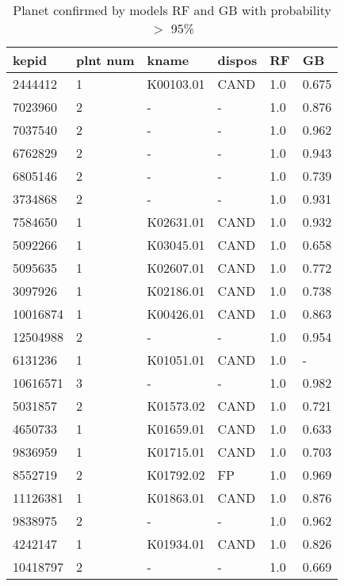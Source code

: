 \begin{table}[!htbp]
 \centering
 \caption{Planet confirmed by models RF and GB with probability $>$ 95\%}
 \label{dataRFGBcreftab} 
  \begin{tabular}
{| 
 p{}| 
 p{}| 
 p{}| 
 p{}| 
 p{}| 
 p{}| 
}\hline 
\textbf{kepid} &\textbf{plnt num} &\textbf{kname} &\textbf{dispos} &\textbf{RF} &\textbf{GB} \\ \hline 
2444412 &1 &K00103.01 &CAND &1.0 &0.675 \\ \hline 
7023960 &2 &- &- &1.0 &0.876 \\ \hline 
7037540 &2 &- &- &1.0 &0.962 \\ \hline 
6762829 &2 &- &- &1.0 &0.943 \\ \hline 
6805146 &2 &- &- &1.0 &0.739 \\ \hline 
3734868 &2 &- &- &1.0 &0.931 \\ \hline 
7584650 &1 &K02631.01 &CAND &1.0 &0.932 \\ \hline 
5092266 &1 &K03045.01 &CAND &1.0 &0.658 \\ \hline 
5095635 &1 &K02607.01 &CAND &1.0 &0.772 \\ \hline 
3097926 &1 &K02186.01 &CAND &1.0 &0.738 \\ \hline 
10016874 &1 &K00426.01 &CAND &1.0 &0.863 \\ \hline 
12504988 &2 &- &- &1.0 &0.954 \\ \hline 
6131236 &1 &K01051.01 &CAND &1.0 &- \\ \hline 
10616571 &3 &- &- &1.0 &0.982 \\ \hline 
5031857 &2 &K01573.02 &CAND &1.0 &0.721 \\ \hline 
4650733 &1 &K01659.01 &CAND &1.0 &0.633 \\ \hline 
9836959 &1 &K01715.01 &CAND &1.0 &0.703 \\ \hline 
8552719 &2 &K01792.02 &FP &1.0 &0.969 \\ \hline 
11126381 &1 &K01863.01 &CAND &1.0 &0.876 \\ \hline 
9838975 &2 &- &- &1.0 &0.962 \\ \hline 
4242147 &1 &K01934.01 &CAND &1.0 &0.826 \\ \hline 
10418797 &2 &- &- &1.0 &0.669 \\ \hline 

\end{tabular}
\end{table}
